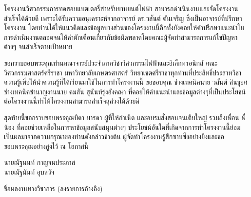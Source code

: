 \begin{acknowledgements}
	โครงงานวิศวกรรมการทดสอบแบตเตอรี่สำหรับยานยนต์ไฟฟ้า สามารถดำเนินงานและจัดโครงงานสำเร็จได้ด้วยดี เพราะได้รับความอนุเคราะห์จากอาจารย์ ดร.วสันต์ ตันเจริญ ซึ่งเป็นอาจารย์ที่ปรึกษาโครงงาน โดยท่านได้ให้แนวคิดและข้อมูลบางส่วนของโครงงานนี้อีกทั้งยังคอยให้คำปรึกษาแนะนำในการดำเนินงานตลอดจนให้คำตักเตือนเกี่ยวกับข้อผิดพลาดโดยคณะผู้จัดทำสามารถการแก้ไขปัญหาต่างๆ จนสำเร็จตามเป้าหมาย
 
ขอกราบขอบพระคุณท่านคณาจารย์ประจำภาควิชาวิศวกรรมไฟฟ้าและอิเล็กทรอนิกส์ คณะวิศวกรรมศาสตร์ศรีราชา มหาวิทยาลัยเกษตรศาสตร์ วิทยาเขตศรีราชาทุกท่านที่ประสิทธิ์ประสาทวิชาความรู้เพื่อให้นำความรู้ที่ได้เรียนมาใช้ในการทำโครงงานนี้ ขอขอบคุณ ช่างเทคนิคนาย วสันต์ สินธุยศ ช่างเทคนิคชำนาญงานนาย คมสัน สุนันท์รุ่งอังคณา ที่คอยให้คำแนะนำและข้อมูลต่างๆที่เป็นประโยชน์ต่อโครงงานนี้ทำให้โครงงานสามารถสำเร็จลุล่วงได้ด้วยดี

สุดท้ายนี้ขอกราบขอบพระคุณบิดา มารดา ผู้ที่ให้กำเนิด และอบรมสั่งสอนจนเติบใหญ่ รวมถึงเพื่อน พี่ น้อง ที่คอยช่วยเหลือในการหาข้อมูลสนับสนุนต่างๆ ประโยชน์อันใดที่เกิดจากการทำโครงงานนี้ย่อมเป็นผลมาจากความกรุณาของท่านดังกล่าวข้างต้น ผู้จัดทำโครงงานรู้สึกซาบซึ้งอย่างยิ่งและขอขอบพระคุณอย่างสูงไว้ ณ โอกาสนี้
 \begin{flushright}
	นายณัฐนนท์ กาญจนประภาส \\ 
	นายณัฐนันท์ อุบลวัจ
  \end{flushright}
\end{acknowledgements}




\begin{publications}
	ชื่อผลงานทางวิชาการ (ลงรายการอ้างอิง)
\end{publications}








